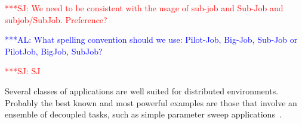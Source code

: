 \documentclass[conference,final]{IEEEtran}
\newcommand{\alnote}[1]{ {\textcolor{blue} { ***AL: #1 }}}
\newcommand{\jhanote}[1]{ {\textcolor{red} { ***SJ: #1 }}}
\newcommand{\alnote}[1]{}
\newcommand{\jhanote}[1]{}
\begin{document}








\jhanote{We need to be consistent with the usage of sub-job and
  Sub-Job and subjob/SubJob. Preference?}

\alnote{What spelling convention should we use: Pilot-Job, Big-Job, Sub-Job or PilotJob, BigJob, SubJob?}

 \jhanote{SJ}

Several classes of applications are well suited for distributed
environments. Probably the best known and most powerful examples are
those that involve an ensemble of decoupled tasks, such as simple
parameter sweep applications~\cite{1239909}.
\end{document}

